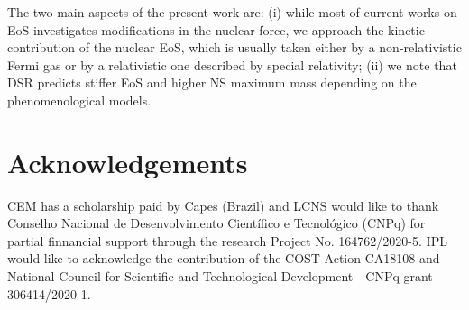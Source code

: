 \documentclass[final,5p,times,twocolumn]{elsarticle}
\begin{document}
The two main aspects of the present work are: (i) while most of current works on EoS investigates modifications in the nuclear force, we approach the kinetic contribution of the nuclear EoS, which is usually taken either by a non-relativistic Fermi gas or by a relativistic one described by special relativity; (ii) we note that DSR predicts stiffer EoS and higher NS maximum mass depending on the phenomenological models.

\section*{Acknowledgements}
 CEM has a scholarship paid by Capes (Brazil) and LCNS would like to thank Conselho Nacional de Desenvolvimento Cient\'ifico e Tecnol\'ogico (CNPq) for partial finnancial support through the research Project No. 164762/2020-5. IPL would like to acknowledge the contribution of the COST Action CA18108 and National Council for Scientific and Technological Development - CNPq grant 306414/2020-1.



\end{document}
